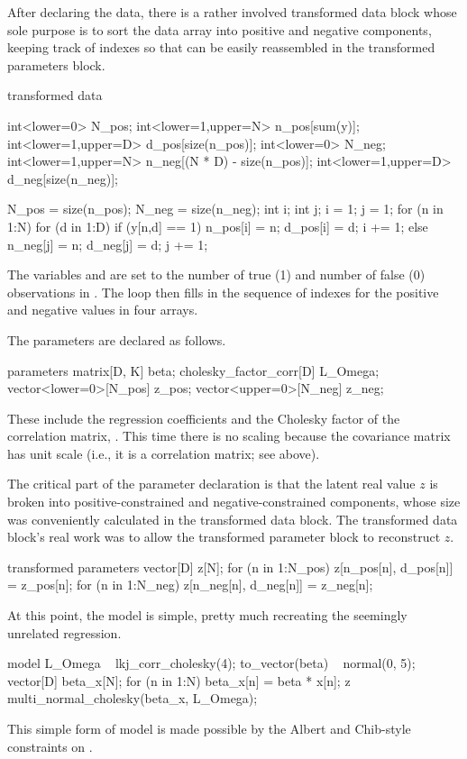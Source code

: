 After declaring the data, there is a rather involved transformed data
block whose sole purpose is to sort the data array  into
positive and negative components, keeping track of indexes so that
 can be easily reassembled in the transformed parameters
block.
%
\begin{stancode}
transformed data {
  int<lower=0> N_pos;
  int<lower=1,upper=N> n_pos[sum(y)];
  int<lower=1,upper=D> d_pos[size(n_pos)];
  int<lower=0> N_neg;
  int<lower=1,upper=N> n_neg[(N * D) - size(n_pos)];
  int<lower=1,upper=D> d_neg[size(n_neg)];

  N_pos = size(n_pos);
  N_neg = size(n_neg);
  {
    int i;
    int j;
    i = 1;
    j = 1;
    for (n in 1:N) {
      for (d in 1:D) {
        if (y[n,d] == 1) {
          n_pos[i] = n;
          d_pos[i] = d;
          i += 1;
        } else {
          n_neg[j] = n;
          d_neg[j] = d;
          j += 1;
        }
      }
    }
  }
}
\end{stancode}
%
The variables  and  are set to the number of
true (1) and number of false (0) observations in .  The loop
then fills in the sequence of indexes for the positive and negative
values in four arrays.

The parameters are declared as follows.
%
\begin{stancode}
parameters {
  matrix[D, K] beta;
  cholesky_factor_corr[D] L_Omega;
  vector<lower=0>[N_pos] z_pos;
  vector<upper=0>[N_neg] z_neg;
}
\end{stancode}
%
These include the regression coefficients  and the Cholesky
factor of the correlation matrix, .  This time there is
no scaling because the covariance matrix has unit scale (i.e., it is a
correlation matrix;  see above).

The critical part of the parameter declaration is that the latent real
value $z$ is broken into positive-constrained and negative-constrained
components, whose size was conveniently calculated in the transformed
data block.  The transformed data block's real work was to allow the
transformed parameter block to reconstruct $z$.
%
\begin{stancode}
transformed parameters {
  vector[D] z[N];
  for (n in 1:N_pos)
    z[n_pos[n], d_pos[n]] = z_pos[n];
  for (n in 1:N_neg)
    z[n_neg[n], d_neg[n]] = z_neg[n];
}
\end{stancode}

At this point, the model is simple, pretty much recreating the
seemingly unrelated regression.
%
\begin{stancode}
model {
  L_Omega ~ lkj_corr_cholesky(4);
  to_vector(beta) ~ normal(0, 5);
  {
    vector[D] beta_x[N];
    for (n in 1:N)
      beta_x[n] = beta * x[n];
    z ~ multi_normal_cholesky(beta_x, L_Omega);
  }
}
\end{stancode}
%
This simple form of model is made possible by the Albert and
Chib-style constraints on .

